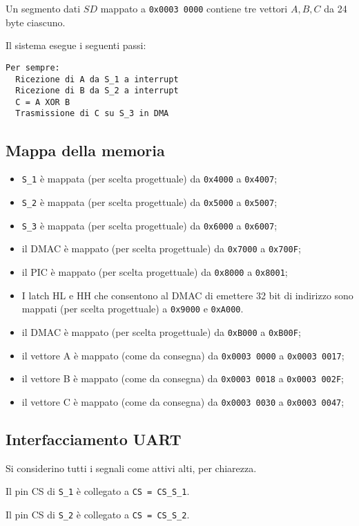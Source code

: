 \documentclass[a4paper]{article}
\begin{document}
Un segmento dati $SD$ mappato a \texttt{0x0003 0000} contiene tre vettori $A, B, C$ da 24 byte ciascuno.

Il sistema esegue i seguenti passi:
\begin{verbatim}
Per sempre:
  Ricezione di A da S_1 a interrupt
  Ricezione di B da S_2 a interrupt
  C = A XOR B
  Trasmissione di C su S_3 in DMA
\end{verbatim}

\subsection{Mappa della memoria}
\begin{itemize}
\item \texttt{S\_1} è mappata (per scelta progettuale) da \texttt{0x4000} a \texttt{0x4007};
\item \texttt{S\_2} è mappata (per scelta progettuale) da \texttt{0x5000} a \texttt{0x5007};
\item \texttt{S\_3} è mappata (per scelta progettuale) da \texttt{0x6000} a \texttt{0x6007};
\item il DMAC è mappato (per scelta progettuale) da \texttt{0x7000} a \texttt{0x700F};
\item il PIC è mappato (per scelta progettuale) da \texttt{0x8000} a \texttt{0x8001};
\item I latch HL e HH che consentono al DMAC di emettere 32 bit di indirizzo sono mappati (per scelta progettuale) a \texttt{0x9000} e \texttt{0xA000}.
\item il DMAC è mappato (per scelta progettuale) da \texttt{0xB000} a \texttt{0xB00F};
\item il vettore A è mappato (come da consegna) da \texttt{0x0003 0000} a \texttt{0x0003 0017};
\item il vettore B è mappato (come da consegna) da \texttt{0x0003 0018} a \texttt{0x0003 002F};
\item il vettore C è mappato (come da consegna) da \texttt{0x0003 0030} a \texttt{0x0003 0047};
\end{itemize}

\subsection{Interfacciamento UART}
Si considerino tutti i segnali come attivi alti, per chiarezza.

Il pin CS di \texttt{S\_1} è collegato a \texttt{CS = CS\_S\_1}.

Il pin CS di \texttt{S\_2} è collegato a \texttt{CS = CS\_S\_2}.
\end{document}
